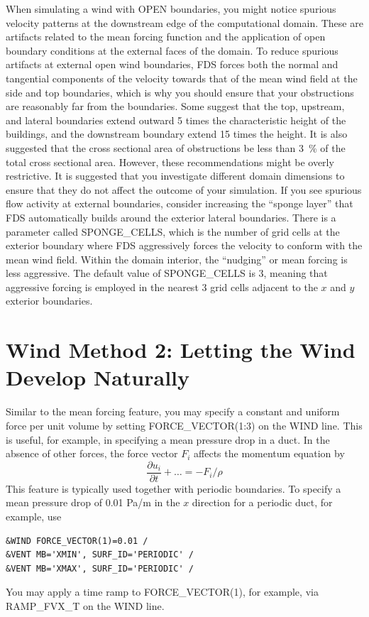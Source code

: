 \documentclass[11pt]{book}
\begin{document}
When simulating a wind with {\ct OPEN} boundaries, you might notice spurious velocity patterns at the downstream edge of the computational domain. These are artifacts related to the mean forcing function and the application of open boundary conditions at the external faces of the domain. To reduce spurious artifacts at external open wind boundaries, FDS forces both the normal and tangential components of the velocity towards that of the mean wind field at the side and top boundaries, which is why you should ensure that your obstructions are reasonably far from the boundaries. Some suggest that the top, upstream, and lateral boundaries extend outward 5 times the characteristic height of the buildings, and the downstream boundary extend 15 times the height. It is also suggested that the cross sectional area of obstructions be less than 3~\% of the total cross sectional area. However, these recommendations might be overly restrictive. It is suggested that you investigate different domain dimensions to ensure that they do not affect the outcome of your simulation. If you see spurious flow activity at external boundaries, consider increasing the ``sponge layer'' that FDS automatically builds around the exterior lateral boundaries. There is a parameter called {\ct SPONGE\_CELLS}, which is the number of grid cells at the exterior boundary where FDS aggressively forces the velocity to conform with the mean wind field. Within the domain interior, the ``nudging'' or mean forcing is less aggressive. The default value of {\ct SPONGE\_CELLS} is 3, meaning that aggressive forcing is employed in the nearest 3 grid cells adjacent to the $x$ and $y$ exterior boundaries.



\section{Wind Method 2: Letting the Wind Develop Naturally}
\label{info:force_vector}

Similar to the mean forcing feature, you may specify a constant and uniform force per unit volume by setting {\ct FORCE\_VECTOR(1:3)} on the {\ct WIND} line.  This is useful, for example, in specifying a mean pressure drop in a duct.  In the absence of other forces, the force vector $F_i$ affects the momentum equation by
\begin{equation}
\frac{\partial u_i}{\partial t} + \dots = -F_i/\rho
\end{equation}
This feature is typically used together with periodic boundaries.  To specify a mean pressure drop of 0.01 Pa/m in the $x$ direction for a periodic duct, for example, use
\begin{lstlisting}
&WIND FORCE_VECTOR(1)=0.01 /
&VENT MB='XMIN', SURF_ID='PERIODIC' /
&VENT MB='XMAX', SURF_ID='PERIODIC' /
\end{lstlisting}
You may apply a time ramp to {\ct FORCE\_VECTOR(1)}, for example, via {\ct RAMP\_FVX\_T} on the {\ct WIND} line.
\end{document}
